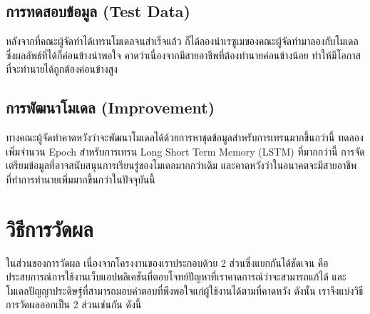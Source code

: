 \subsection{การทดสอบข้อมูล (Test Data)}
หลังจากที่คณะผู้จัดทำได้เทรนโมเดลจนสำเร็จแล้ว ก็ได้ลองนำเรซูเมของคณะผู้จัดทำมาลองกับโมเดล ซึ่งผลลัพธ์ที่ได้ก็ค่อนข้างน่าพอใจ
คาดว่าเนื่องจากมีสายอาชีพที่ต้องทำนายค่อนข้างน้อย ทำให้มีโอกาสที่จะทำนายได้ถูกต้องค่อนข้างสูง

\subsection{การพัฒนาโมเดล (Improvement)}
ทางคณะผู้จัดทำคาดหวังว่าจะพัฒนาโมเดลได้ด้วยการหาชุดข้อมูลสำหรับการเทรนมากขึ้นกว่านี้ ทดลองเพิ่มจำนวน Epoch สำหรับการเทรน
Long Short Term Memory (LSTM) ที่มากกว่านี้ การจัดเตรียมข้อมูลที่อาจสนับสนุนการเรียนรู่ของโมเดลมากกว่าเดิม และคาดหวังว่าในอนาคตจะมีสายอาชีพที่ทำการทำนายเพิ่มมากขึ้นกว่าในปัจจุบันนี้


\section{วิธีการวัดผล}
ในส่วนของการวัดผล เนื่องจากโครงงานของเราประกอบด้วย 2 ส่วนซึ่งแยกกันได้ชัดเจน คือ ประสบการณ์การใช้งานเว็บแอปพลิเคชันที่ตอบโจทย์ปัญหาที่เราคาดการณ์ว่าจะสามารถแก้ได้
และโมเดลปัญญาประดิษฐ์ที่สามารถมอบคำตอบที่พึงพอใจแก่ผู้ใช้งานได้ตามที่คาดหวัง ดังนั้น เราจึงแบ่งวิธีการวัดผลออกเป็น 2 ส่วนเช่นกัน ดังนี้

